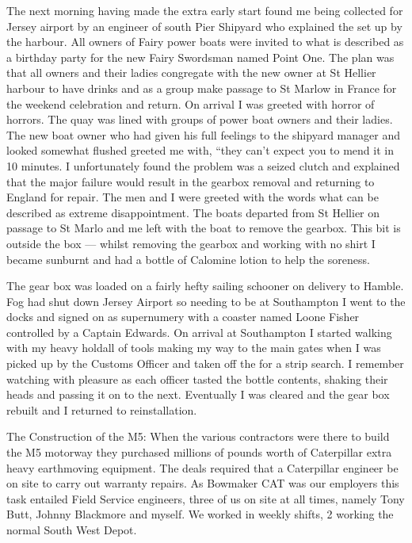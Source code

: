 The next morning having made the extra early start found me being collected for
Jersey airport by an engineer of south Pier Shipyard who explained the set up
by the harbour. All owners of Fairy power boats were invited to what is
described as a birthday party for the new Fairy Swordsman named Point One. The
plan was that all owners and their ladies congregate with the new owner at St
Hellier harbour to have drinks and as a group make passage to St Marlow in
France for the weekend celebration and return. On arrival I was greeted with
horror of horrors. The quay was lined with groups of power boat owners and
their ladies. The new boat owner who had given his full feelings to the
shipyard manager and looked somewhat flushed greeted me with, ``they can't
expect you to mend it in 10 minutes. I unfortunately found the problem was a
seized clutch and explained that the major failure would result in the gearbox
removal and returning to England for repair. The men and I were greeted with
the words what can be described as extreme disappointment. The boats departed
from St Hellier on passage to St Marlo and me left with the boat to remove the
gearbox. This bit is outside the box --- whilst removing the gearbox and working
with no shirt I became sunburnt and had a bottle of Calomine lotion to help the
soreness.

The gear box was loaded on a fairly hefty sailing schooner on delivery to
Hamble. Fog had shut down Jersey Airport so needing to be at Southampton I
went to the docks and signed on as supernumery with a coaster named Loone
Fisher controlled by a Captain Edwards. On arrival at Southampton I started
walking with my heavy holdall of tools making my way to the main gates when I
was picked up by the Customs Officer and taken off the for a strip search. I
remember watching with pleasure as each officer tasted the bottle contents,
shaking their heads and passing it on to the next. Eventually I was cleared
and the gear box rebuilt and I returned to reinstallation.

The Construction of the M5: When the various contractors were there to build
the M5 motorway they purchased millions of pounds worth of Caterpillar extra
heavy earthmoving equipment. The deals required that a Caterpillar engineer be
on site to carry out warranty repairs. As Bowmaker CAT was our employers this
task entailed Field Service engineers, three of us on site at all times, namely
Tony Butt, Johnny Blackmore and myself. We worked in weekly shifts, 2 working
the normal South West Depot.

